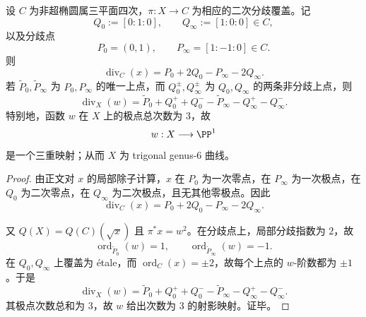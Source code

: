 \begin{theorem}\label{thm:conclusion-genus6-trigonal-triggered-by-w-divisor}
设 \(C\) 为非超椭圆属三平面四次，\(\pi:X\to C\) 为相应的二次分歧覆盖。记
\[
Q_0:=[0:1:0],\qquad Q_\infty:=[1:0:0]\in C,
\]
以及分歧点
\[
P_0=(0,1),\qquad P_\infty=[1:-1:0]\in C.
\]
则
\[
\operatorname{div}_C(x)=P_0+2Q_0-P_\infty-2Q_\infty.
\]
若 \(\widetilde P_0,\widetilde P_\infty\) 为 \(P_0,P_\infty\) 的唯一上点，而 \(Q_0^\pm,Q_\infty^\pm\) 为 \(Q_0,Q_\infty\) 的两条非分歧上点，则
\[
\operatorname{div}_X(w)=\widetilde P_0+Q_0^++Q_0^- -\widetilde P_\infty-Q_\infty^+-Q_\infty^-.
\]
特别地，函数 \(w\) 在 \(X\) 上的极点总次数为 \(3\)，故
\[
w:X\longrightarrow \PP^1
\]
是一个三重映射；从而 \(X\) 为 trigonal genus-\(6\) 曲线。
\end{theorem}
\begin{proof}
由正文对 \(x\) 的局部除子计算，\(x\) 在 \(P_0\) 为一次零点，在 \(P_\infty\) 为一次极点，在 \(Q_0\) 为二次零点，在 \(Q_\infty\) 为二次极点，且无其他零极点。因此
\[
\operatorname{div}_C(x)=P_0+2Q_0-P_\infty-2Q_\infty.
\]

又 \(Q(X)=Q(C)(\sqrt{x})\) 且 \(\pi^\ast x=w^2\)。在分歧点上，局部分歧指数为 \(2\)，故
\[
\operatorname{ord}_{\widetilde P_0}(w)=1,
\qquad
\operatorname{ord}_{\widetilde P_\infty}(w)=-1.
\]
在 \(Q_0,Q_\infty\) 上覆盖为 \'{e}tale，而 \(\operatorname{ord}_C(x)=\pm 2\)，故每个上点的 \(w\)-阶数都为 \(\pm 1\)。于是
\[
\operatorname{div}_X(w)=\widetilde P_0+Q_0^++Q_0^- -\widetilde P_\infty-Q_\infty^+-Q_\infty^-.
\]
其极点次数总和为 \(3\)，故 \(w\) 给出次数为 \(3\) 的射影映射。证毕。
\end{proof}

